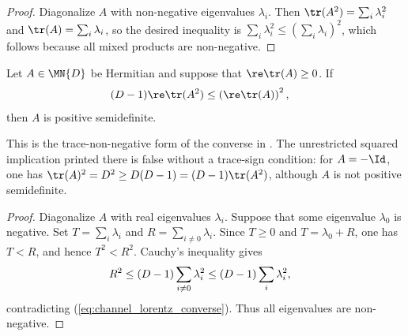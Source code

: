 \begin{proof}\leanok
    Diagonalize $A$ with non-negative eigenvalues $\lambda_i$. Then
    $\tr(A^2)=\sum_i\lambda_i^2$ and $\tr(A)=\sum_i\lambda_i$, so the desired
    inequality is $\sum_i\lambda_i^2\le(\sum_i\lambda_i)^2$, which follows
    because all mixed products are non-negative.
\end{proof}

\begin{theorem}
    \label{thm:trace_nonnegative_lorentz_cone_converse}
    \leanok
    Let $A\in\MN{D}$ be Hermitian and suppose that
    $\re\tr(A)\ge0$. If
    \begin{align}
        (D-1)\re\tr(A^2)
         & \le \left(\re\tr(A)\right)^2,
        \label{eq:channel_lorentz_converse}
    \end{align}
    then $A$ is positive semidefinite.

    This is the trace-non-negative form of the converse in
    \cite[Proposition~3.7]{Wolf2012Quantum}. The unrestricted squared
    implication printed there is false without a trace-sign condition: for
    $A=-\Id$, one has $\tr(A)^2=D^2\ge D(D-1)=(D-1)\tr(A^2)$, although $A$ is
    not positive semidefinite.
\end{theorem}

\begin{proof}\leanok
    Diagonalize $A$ with real eigenvalues $\lambda_i$. Suppose that some
    eigenvalue $\lambda_0$ is negative. Set
    $T=\sum_i\lambda_i$ and $R=\sum_{i\ne 0}\lambda_i$. Since $T\ge0$ and
    $T=\lambda_0+R$, one has $T<R$, and hence $T^2<R^2$. Cauchy's inequality
    gives
    \begin{align}
        R^2
         & \le (D-1)\sum_{i\ne 0}\lambda_i^2
        \le (D-1)\sum_i\lambda_i^2,
        \notag
    \end{align}
    contradicting (\ref{eq:channel_lorentz_converse}). Thus all eigenvalues
    are non-negative.
\end{proof}
